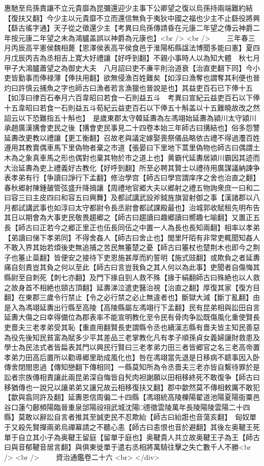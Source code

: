 惠馳至烏孫責讓不立元貴靡為昆彌還迎少主事下公卿望之復以烏孫持兩端難約結【復扶又翻】今少主以元貴靡不立而還信無負于夷狄中國之福也少主不止繇役將興【繇古徭字通】天子從之徵還少主【考異曰烏孫傳請昏在元康二年望之傳云神爵二年按元康二年望之未為鴻臚盖誤以神爵為元康也】<br />
<br />
　　三年春三月丙辰高平憲侯魏相薨【恩澤侯表高平侯食邑于淮陽柘縣諡法博聞多能曰憲】夏四月戊辰丙吉為丞相吉上寛大好禮讓【好呼到翻】不親小事時人以為知大體　秋七月甲子大鴻臚蕭望之為御史大夫　八月詔曰吏不亷平則治道衰【治直吏翻下同】今小吏皆勤事而俸禄薄【俸扶用翻】欲無侵漁百姓難矣【如淳曰漁奪也謂奪其利便也晉灼曰許慎云捕魚之字也師古曰漁者若言漁獵也晉說是也】其益吏百石已下俸十五【如淳曰律百石奉月六百韋昭曰若食一石則益五斗　考異曰宣紀云益吏百石以下俸十五韋昭曰若食一石則益五斗荀紀云益吏百石以下俸五十斛盖以十五難曉故改之然詔云以下恐難指五十斛也】　是歲東郡太守韓延夀為左馮翊始延夀為潁川太守潁川承趙廣漢搆會吏民之後【搆會吏民事見二十四卷本始三年師古曰搆結也】俗多怨讐延夀改更教以禮讓【更工衡翻】召故老與議定嫁娶喪祭儀品略依古禮不得過灋百姓遵用其教賣偶車馬下里偽物者棄之市道【張晏曰下里地下蒿里偽物也師古曰偶謂土木為之象真車馬之形也偶對也棄其物於市之道上也】黄霸代延夀居潁川霸因其迹而大治延夀為吏上禮義好古教化【好呼到翻】所至必聘其賢士以禮待用廣謀議納諫争表孝弟有行【争讀曰諍行下孟翻】修治學宫【師古曰學宫謂庠序之舍也治直之翻】春秋郷射陳鍾皷管弦盛升降揖讓【周禮地官郷大夫以郷射之禮五物詢衆庶一曰和二曰容三曰主皮四曰和容五曰興舞】及都試講武設斧鉞旌旗習射御之事【漢諸郡以八月都試講武事也如淳曰太守都尉令長丞尉會都試課殿最也】治城郭收賦租先明布告其日以期會為大事吏民敬畏趨郷之【師古曰趨讀曰趣郷讀曰嚮趣七喻翻】又置正五長【師古曰正若今之郷正里正也伍長同伍之中置一人為長也長知兩翻】相率以孝弟【弟讀曰悌下孝弟同】不得舍姦人【師古曰舍止也】閭里阡陌有非常吏輒聞知姦人不敢入界其始若煩後吏無追捕之苦民無箠楚之憂【師古曰箠杖也楚荆木也即今之荆子也箠止蘂翻】皆便安之接待下吏恩施甚厚而約誓明【施式豉翻】或欺負之者延夀痛自刻責豈其負之何以至此【師古曰言豈我負之其人何以為此事】吏聞者自傷悔其縣尉至自刺死【刺七亦翻】及門下掾自剄人救不殊【掾于絹翻師古曰殊絶也以人救之故身首不相絶也頸古頂翻】延夀涕泣遣吏醫治視【治直之翻】厚復其家【復方目翻】在東郡三歲令行禁止【令之必行禁之必止無違者也】斷獄大減【斷丁亂翻】由是入為馮翊延夀出行縣至高陵【高陵縣屬左馮翊行下孟翻】民有昆弟相與訟田自言延夀大傷之曰幸得備位為郡表率不能宣明教化至令民有骨肉争訟既傷風化重使賢長吏嗇夫三老孝弟受其恥【重直用翻賢長吏謂縣令丞也續漢志縣有嗇夫皆主知民善惡為役先後知民貧富為賦多少平其差品三老掌教化凡有孝子順孫貞女義婦讓財救患及學士為民法式者皆扁表其門以興民行賢曰三老孝弟力田三者皆郷官之名三老高帝置孝弟力田高后置所以勸導郷里助成風化也】咎在馮翊當先退是日移病不聼事因入卧傳舍閉閤思過【傳知戀翻下傳相同】一縣莫知所為令丞嗇夫三老亦皆自繫待罪於是訟者宗族傳相責讓此兩昆弟深自悔皆自髠肉袒謝願以田相移終死不敢復争【師古曰移猶傳也一說兄以讓弟弟又讓兄故云相移復扶又翻】郡中歙然莫不傳相敕厲不敢犯【歙與翕同許及翻】延夀恩信周徧二十四縣【馮翊統高陵櫟陽翟道池陽夏陽衙粟邑谷口蓮勺鄜頻陽臨晉重泉郃陽祋祤武城沈陽□德徵雲陵萬年長陵陽陵雲陽二十四縣】莫敢以辭訟自言者推其至誠吏民不忍欺紿【師古曰紿誑也音蕩亥翻】　匈奴單于又殺先賢撣兩弟烏禪幕請之不聽心恚【師古曰恚恨也音於避翻】其後左奥鞬王死單于自立其小子為奥鞬王留庭【留單于庭也】奥鞬貴人共立故奥鞬王子為王【師古曰與音郁鞬音居言翻】與俱東徙單于遣右丞相將萬騎往擊之失亡數千人不勝<br />
<br />
　　資治通鑑卷二十六  <br>
   </div> 

